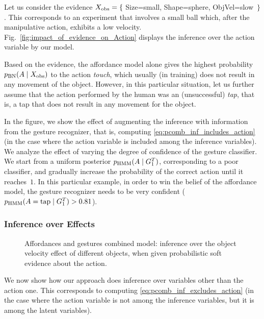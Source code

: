 Let us consider the evidence
$X_\text{obs} = \{$ Size=small, Shape=sphere, ObjVel=slow~$\}$.
This corresponds to an experiment that involves a small ball which, after the manipulative action, exhibits a low velocity.
Fig.~\ref{fig:impact_of_evidence_on_Action} displays the inference over the action variable by our model.

Based on the evidence, the affordance model alone gives the highest probability $p_{\text{BN}}(A \mid X_\text{obs})$ to the action \emph{touch}, which usually (in training) does not result in any movement of the object.
However, in this particular situation, let us further assume that the action performed by the human was an (unsuccessful) \emph{tap}, that is, a tap that does not result in any movement for the object.

In the figure, we show the effect of augmenting the inference with information from the gesture recognizer, that is, computing \eqref{eq:pcomb_inf_includes_action} (in the case where the action variable is included among the inference variables).
We analyze the effect of varying the degree of confidence of the gesture classifier.
We start from a uniform posterior $p_{\text{HMM}}(A \mid G_1^T)$, corresponding to a poor classifier, and gradually increase the probability of the correct action until it reaches~$1$.
In this particular example, in order to win the belief of the affordance model, the gesture recognizer needs to be very confident ($p_{\text{HMM}}(A=\text{tap} \mid G_1^T) > 0.81$).

\subsubsection{Inference over Effects}
\label{sec:gestures:results:affgest:inference_effects}

\begin{figure*}
\centering
{} \quad
%
\caption{Affordances and gestures combined model: inference over the object velocity effect of different objects, when given probabilistic soft evidence about the action.}
\label{fig:impact_of_evidence_on_ObjVel}
\end{figure*}

We now show how our approach does inference over variables other than the action one.
This corresponds to computing \eqref{eq:pcomb_inf_excludes_action} (in the case where the action variable is not among the inference variables, but it is among the latent variables).

